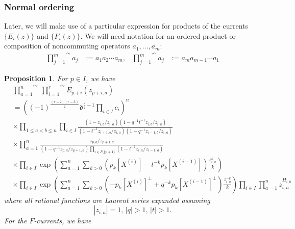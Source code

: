 \documentclass[10pt,a4paper]{amsart}
\newtheorem{prop}{Proposition}
\newcommand{\ddd}{\mathfrak{d}}
\begin{document}
\subsubsection{Normal ordering}
Later, we will make use of a particular expression for products of the currents $\{E_i(z)\}$ and $\{F_i(z)\}$.
We will need notation for an ordered product or composition of noncommuting operators $a_1,\ldots, a_m$:
\begin{equation}
    \begin{aligned}
    \overset{\curvearrowright}{\prod_{j=1}^m}a_j&:=a_1 a_2\cdots a_m,&
    \overset{\curvearrowleft}{\prod_{j=1}^m}a_j&:=a_m a_{m-1}\cdots a_1
    \end{aligned}
\label{OrdProd}
\end{equation}
\begin{prop}\label{NormalOrder}
For $p\in I$, we have
\begin{equation}
\begin{aligned}
&\overset{\curvearrowright}{\prod_{a=1}^n}\,\overset{\curvearrowright}{\prod_{i=1}^{r}}E_{p+i}(z_{p+i,a})\\
&=
\left( (-1)^{\frac{(r-2)(r-3)}{2}}\ddd^{\frac{r}{2}-1}\prod_{i\in I} c_i\right)^n\\
&\times\prod_{1\le a<b\le n}\prod_{i\in I}
\frac{\displaystyle\left(1-z_{i,b}/z_{i,a}\right)\left(1-q^{-1}t^{-1}z_{i,b}/z_{i,a}\right)}{\displaystyle\left(1-t^{-1}z_{i+1,b}/z_{i,a}\right)\left(1-q^{-1}z_{i-1,b}/z_{i,a}\right)}\\
&\times\prod_{a=1}^n \frac{z_{p,a}/z_{p+1,a}}
{\left(1-q^{-1}z_{p,a}/z_{p+1,a}\right)
\prod_{i\in I\setminus\{p+1\}}
\left(1-t^{-1}z_{i,a}/z_{i-1,a}\right)}\\
&\times\prod_{i\in I}\exp\left(\sum_{a=1}^n\sum_{k>0}\left(p_{k}[X^{(i)}]-t^{-k}p_k[X^{(i-1)}]\right)\frac{z_{i,a}^{k}}{k}\right)\\
&\times\prod_{i\in I}\exp\left(\sum_{a=1}^n\sum_{k>0}\left(-p_{k}[X^{(i)}]^\perp+q^{-k}p_k[X^{(i-1)}]^\perp\right)\frac{z_{i,a}^{-k}}{k}\right)
\prod_{i\in I}\prod_{a=1}^n z_{i,a}^{H_{i,0}}
\end{aligned}
\label{ENormalOrder}
\end{equation}
where all rational functions are Laurent series expanded assuming 
\begin{equation}
|z_{i,a}|=1,\,|q|>1,\,|t|>1.
\label{NormalEExpand}
\end{equation}
For the $F$-currents, we have
\begin{equation}
\begin{aligned}

\end{aligned}
\end{equation}
\end{prop}
\end{document}
